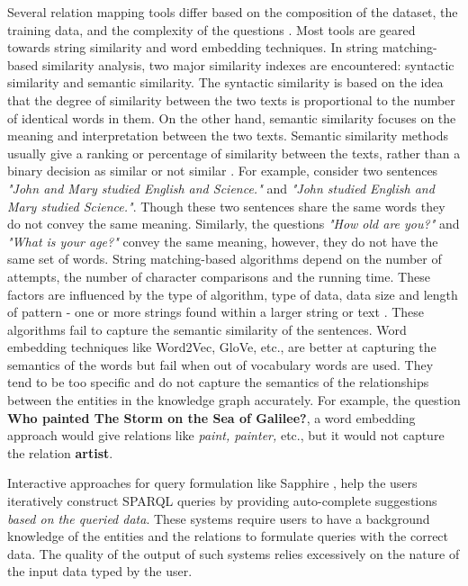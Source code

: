 \begin{sloppypar}
Several relation mapping tools differ based on the composition of the dataset, the training data, and the complexity of the questions \cite{4}. Most tools are geared towards string similarity and word embedding techniques. In string matching-based similarity analysis, two major similarity indexes are encountered: syntactic similarity and semantic similarity. The syntactic similarity is based on the idea that the degree of similarity between the two texts is proportional to the number of identical words in them. On the other hand, semantic similarity focuses on the meaning and interpretation between the two texts. Semantic similarity methods usually give a ranking or percentage of similarity between the texts, rather than a binary decision as similar or not similar \cite{Chandrasekaran_2022}.
For example, consider two sentences \textit{"John and Mary studied English and Science."} and \textit{"John studied English and Mary studied Science."}. Though these two sentences share the same words they do not convey the same meaning. Similarly, the questions \textit{"How old are you?"} and \textit{"What is your age?"} convey the same meaning, however, they do not have the same set of words.
String matching-based algorithms depend on the number of attempts, the number of character comparisons and the running time. These factors are influenced by the type of algorithm, type of data, data size and length of pattern - one or more strings found within a larger string or text \cite{5}. These algorithms fail to capture the semantic similarity of the sentences. Word embedding techniques like Word2Vec\cite{word2vec}, GloVe\cite{glove}, etc., are better at capturing the semantics of the words but fail when out of vocabulary words are used. They tend to be too specific and do not capture the semantics of the relationships between the entities in the knowledge graph accurately. For example, the question \textbf{Who painted The Storm on the Sea of Galilee?}, a word embedding approach would give relations like \textit{paint, painter,} etc., but it would not capture the relation \textbf{artist}.  

Interactive approaches for query formulation like Sapphire \cite{sapphire}, help the users iteratively construct SPARQL queries by providing auto-complete suggestions \textit{based on the queried data}. These systems require users to have a background knowledge of the entities and the relations to formulate queries with the correct data. The quality of the output of such systems relies excessively on the nature of the input data typed by the user. 


\end{sloppypar}
